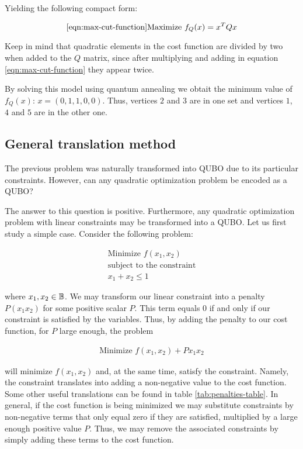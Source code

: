 Yielding the following compact form:

\begin{equation}
\ref{eqn:max-cut-function}
	\text{Maximize  } f_Q(x) = x^T Q x
\end{equation}

Keep in mind that quadratic elements in the cost function are divided by two when added to the $Q$ matrix, since after multiplying and adding in equation \ref{eqn:max-cut-function} they appear twice.

By solving this model using quantum annealing we obtait the minimum value of $f_Q(x)$: $x = (0, 1, 1, 0, 0)$. Thus, vertices $2$ and $3$ are in one set and vertices $1$, $4$ and $5$ are in the other one.


\subsection{General translation method}

The previous problem was naturally transformed into QUBO due to its particular constraints. However, can any quadratic optimization problem be encoded as a QUBO?

The answer to this question is positive. Furthermore, any quadratic optimization problem with linear constraints may be transformed into a QUBO. Let us first study a simple case. Consider the following problem:

\begin{gather*}
	\text{Minimize } f(x_1, x_2) \\
	\text{subject to the constraint} \\
	x_1 + x_2 \leq 1
\end{gather*}

where $x_1, x_2 \in \mathbb{B}$. We may transform our linear constraint into a penalty $P(x_1x_2)$ for some positive scalar $P$. This term equals $0$ if and only if our constraint is satisfied by the variables. Thus, by adding the penalty to our cost function, for $P$ large enough, the problem

\begin{gather*}
	\text{Minimize } f(x_1, x_2) + Px_1x_2
\end{gather*}

will minimize $f(x_1, x_2)$ and, at the same time, satisfy the constraint. Namely, the constraint translates into adding a non-negative value to the cost function. Some other useful translations can be found in table \ref{tab:penalties-table}. In general, if the cost function is being minimized we may substitute constraints by non-negative terms that only equal zero if they are satisfied, multiplied by a large enough positive value $P$. Thus, we may remove the associated constraints by simply adding these terms to the cost function.

